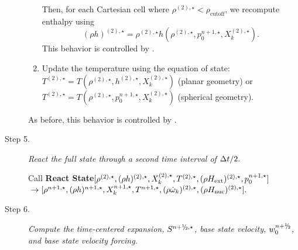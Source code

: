 \begin{description}
\begin{enumerate}
\begin{enumerate}
\end{enumerate}

Then, for each Cartesian cell where $\rho^{(2),\star} < \rho_\mathrm{cutoff}$,
we recompute enthalpy using
\begin{equation}
(\rho h)^{(2),\star} = \rho^{(2),\star}h\left(\rho^{(2),\star},p_0^{n+1,\star},X_k^{(2),\star}\right).
\end{equation}
This behavior is controlled by .

\item Update the temperature using the equation of state:
$T^{(2),\star} = 
  T(\rho^{(2),\star}, h^{(2),\star}, X_k^{(2),\star})$ (planar geometry) or
$T^{(2),\star} = 
  T(\rho^{(2),\star}, p_0^{n+1,\star}, X_k^{(2),\star})$ (spherical geometry).
\end{enumerate}
As before, this behavior is controlled by .

\item[Step 5.] {\em React the full state through a second time interval of $\Delta t / 2.$}

Call {\bf React State}$[ \rho^{(2),\star},(\rho h)^{(2),\star}, X_k^{(2),\star}, T^{(2),\star}, 
(\rho{H_{\rm ext}})^{(2),\star}, p_0^{n+1,\star}]$ \\
 ${}\hfill   \rightarrow [ \rho^{n+1,\star},(\rho h)^{n+1,\star}, X_k^{n+1,\star}, T^{n+1,\star}, (\rho \omegadot_k)^{(2),\star}, (\rho \Hnuc)^{(2),\star} ].$

\item[Step 6.] {\em Compute the time-centered expansion, $S^{\nph,\star}$, base state
velocity, $w_0^{\nph}$, and base state velocity forcing.}

\begin{enumerate}
\renewcommand{\theenumi}{{\bf \Alph{enumi}}}


\end{enumerate}
\end{description}

